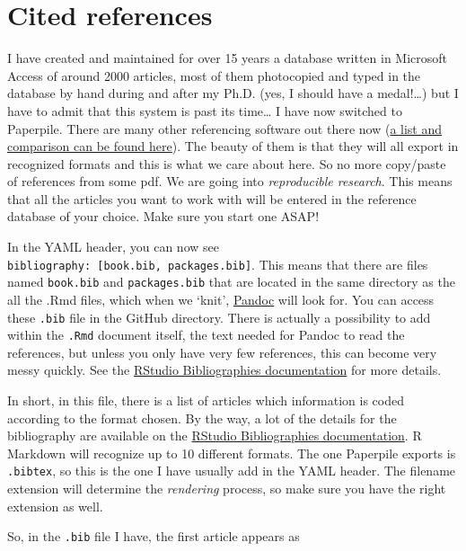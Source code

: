\documentclass[]{book}
\theoremstyle{definition}
\theoremstyle{definition}
\theoremstyle{definition}
\theoremstyle{remark}
\begin{document}
\section{Cited references}\label{cited-references}

I have created and maintained for over 15 years a database written in
Microsoft Access of around 2000 articles, most of them photocopied and
typed in the database by hand during and after my Ph.D. (yes, I should
have a medal!\ldots{}) but I have to admit that this system is past its
time\ldots{} I have now switched to Paperpile. There are many other
referencing software out there now
(\href{https://en.wikipedia.org/wiki/Comparison_of_reference_management_software}{a
list and comparison can be found here}). The beauty of them is that they
will all export in recognized formats and this is what we care about
here. So no more copy/paste of references from some pdf. We are going
into \emph{reproducible research}. This means that all the articles you
want to work with will be entered in the reference database of your
choice. Make sure you start one ASAP!

In the YAML header, you can now see
\texttt{bibliography:\ {[}book.bib,\ packages.bib{]}}. This means that
there are files named \texttt{book.bib} and \texttt{packages.bib} that
are located in the same directory as the all the .Rmd files, which when
we `knit', \href{https://pandoc.org/MANUAL.html}{Pandoc} will look for.
You can access these \texttt{.bib} file in the GitHub directory. There
is actually a possibility to add within the \texttt{.Rmd} document
itself, the text needed for Pandoc to read the references, but unless
you only have very few references, this can become very messy quickly.
See the
\href{http://rmarkdown.rstudio.com/authoring_bibliographies_and_citations.html\#bibliographies}{RStudio
Bibliographies documentation} for more details.

In short, in this file, there is a list of articles which information is
coded according to the format chosen. By the way, a lot of the details
for the bibliography are available on the
\href{http://rmarkdown.rstudio.com/authoring_bibliographies_and_citations.html\#bibliographies}{RStudio
Bibliographies documentation}. R Markdown will recognize up to 10
different formats. The one Paperpile exports is \texttt{.bibtex}, so
this is the one I have usually add in the YAML header. The filename
extension will determine the \emph{rendering} process, so make sure you
have the right extension as well.

So, in the \texttt{.bib} file I have, the first article appears as
\end{document}
